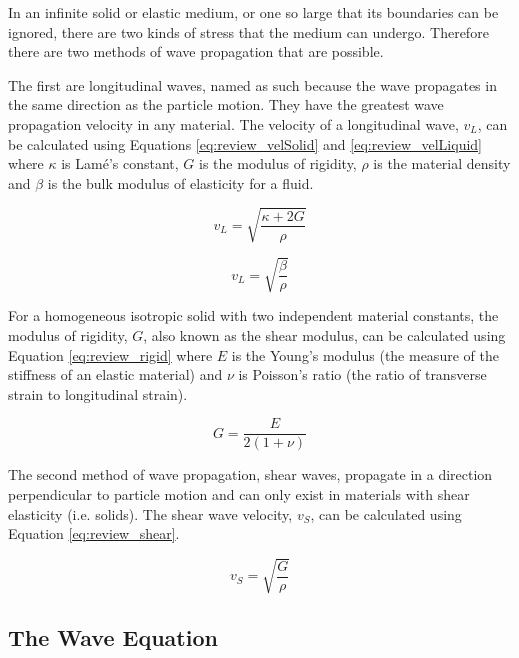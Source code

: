 In an infinite solid or elastic medium, or one so large that its boundaries can be ignored, there are two kinds of stress that the medium can undergo. Therefore there are two methods of wave propagation that are possible. 

The first are longitudinal waves, named as such because the wave propagates in the same direction as the particle motion. They have the greatest wave propagation velocity in any material. The velocity of a longitudinal wave, $v_L$, can be calculated using Equations \ref{eq:review_velSolid} and \ref{eq:review_velLiquid} where $\kappa$ is Lam\'{e}'s constant, $G$ is the modulus of rigidity, $\rho$ is the material density and $\beta$ is the bulk modulus of elasticity for a fluid\cite{halmshaw_non-destructive_1991}.

\begin{equation} \label{eq:review_velSolid}
v_L = \sqrt{\frac{\kappa + 2G}{\rho}}
 \end{equation}

 \begin{equation} \label{eq:review_velLiquid}
v_L = \sqrt{\frac{\beta}{\rho}}
 \end{equation}

For a homogeneous isotropic solid with two independent material constants, the modulus of rigidity, $G$, also known as the shear modulus, can be calculated using Equation \ref{eq:review_rigid}\cite{bush_nondestructive_1989} where $E$ is the Young's modulus (the measure of the stiffness of an elastic material) and $\nu$ is Poisson's ratio (the ratio of transverse strain to longitudinal strain)\cite{boresi_advanced_1993}.

  \begin{equation} \label{eq:review_rigid}
G = \frac{E}{2(1+\nu)}
 \end{equation}

The second method of wave propagation, shear waves, propagate in a direction perpendicular to particle motion and can only exist in materials with shear elasticity (i.e. solids). The shear wave velocity, $v_S$, can be calculated using Equation \ref{eq:review_shear}. 

\begin{equation} \label{eq:review_shear}
v_S = \sqrt{\frac{G}{\rho}}
 \end{equation}

\subsection{The Wave Equation}\label{sec:wave_eq}

